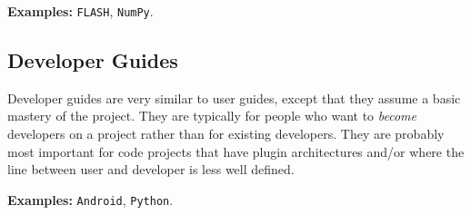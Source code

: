 {\bfseries Examples\+:} {\tt F\+L\+A\+SH}, {\tt Num\+Py}.

\subsection*{Developer Guides}

Developer guides are very similar to user guides, except that they assume a basic mastery of the project. They are typically for people who want to {\itshape become} developers on a project rather than for existing developers. They are probably most important for code projects that have plugin architectures and/or where the line between user and developer is less well defined.

{\bfseries Examples\+:} {\tt Android}, {\tt Python}. 